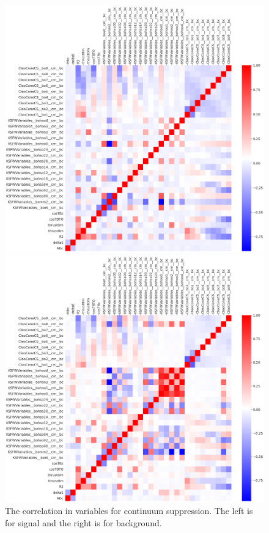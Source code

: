 \begin{figure}[htpb]
	\begin{minipage}[b]{0.5\linewidth}
		\centering 
		\includegraphics[width=1\linewidth]{figures/corr_cs_kine_sig}	
	\end{minipage}
\begin{minipage}[b]{0.5\linewidth}
	\centering 
	\includegraphics[width=1\linewidth]{figures/corr_cs_kine_bkg}	
\end{minipage}
	\caption{The correlation in variables for continuum suppression. The left is for signal and the right is for background.}
	\label{fig:cs_cor}
\end{figure}
